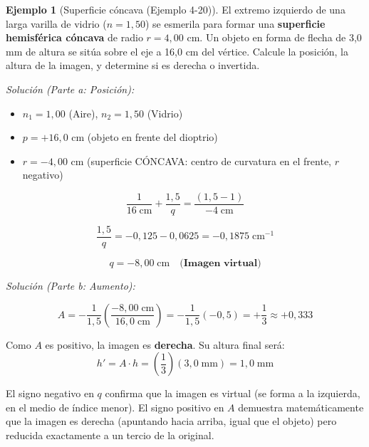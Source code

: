 \documentclass[12pt, a4paper]{article}
\theoremstyle{definition}
\newtheorem{ejemplo}{Ejemplo}[section]
\begin{document}
\begin{ejemplo}[Superficie cóncava (Ejemplo 4-20)]
El extremo izquierdo de una larga varilla de vidrio (\(n = 1{,}50\)) se esmerila para
formar una \textbf{superficie hemisférica cóncava} de radio \(r = 4{,}00\) cm. Un objeto
en forma de flecha de 3,0 mm de altura se sitúa sobre el eje a 16,0 cm del vértice.
Calcule la posición, la altura de la imagen, y determine si es derecha o invertida.

\textit{Solución (Parte a: Posición):}

\begin{itemize}
  \item \(n_1 = 1{,}00\) (Aire), \(n_2 = 1{,}50\) (Vidrio)
  \item \(p = +16{,}0\) cm (objeto en frente del dioptrio)
  \item \(r = -4{,}00\) cm (superficie CÓNCAVA: centro de curvatura en el frente, \(r\)
        negativo)
\end{itemize}

\[
  \frac{1}{16\;\text{cm}} + \frac{1{,}5}{q} = \frac{(1{,}5 - 1)}{-4\;\text{cm}}
\]

\[
  \frac{1{,}5}{q} = -0{,}125 - 0{,}0625 = -0{,}1875\;\text{cm}^{-1}
\]

\[
  q = -8{,}00\;\text{cm} \quad \textbf{(Imagen virtual)}
\]

\textit{Solución (Parte b: Aumento):}

\[
  A = -\frac{1}{1{,}5}\left(\frac{-8{,}00\;\text{cm}}{16{,}0\;\text{cm}}\right)
  = -\frac{1}{1{,}5}(-0{,}5) = +\frac{1}{3} \approx +0{,}333
\]

Como \(A\) es positivo, la imagen es \textbf{derecha}. Su altura final será:
\[
  h' = A \cdot h = \left(\frac{1}{3}\right)(3{,}0\;\text{mm}) = 1{,}0\;\text{mm}
\]

El signo negativo en \(q\) confirma que la imagen es virtual (se forma a la izquierda, en
el medio de índice menor). El signo positivo en \(A\) demuestra matemáticamente que la
imagen es derecha (apuntando hacia arriba, igual que el objeto) pero reducida exactamente
a un tercio de la original.
\end{ejemplo}
\end{document}
